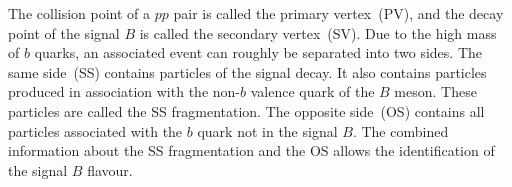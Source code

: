 The collision point of a $pp$ pair is called the primary vertex~(PV), and the decay point of the signal $B$ is called the secondary vertex~(SV).
Due to the high mass of $b$ quarks, an associated event can roughly be separated into two sides.
The same side~(SS) contains particles of the signal decay.
It also contains particles produced in association with the non-$b$ valence quark of the $B$ meson.
These particles are called the SS fragmentation.
The opposite side~(OS) contains all particles associated with the $b$ quark not in the signal $B$.
The combined information about the SS fragmentation and the OS allows the identification of the signal $B$ flavour.
